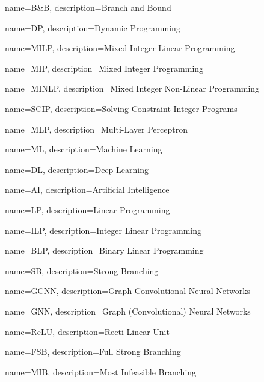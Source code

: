 

\makeglossaries %


{
        name=B\&B,
        description={Branch and Bound}
}

{
        name=DP,
        description={Dynamic Programming}
}

{
        name=MILP,
        description={Mixed Integer Linear Programming}
}

{
        name=MIP,
        description={Mixed Integer Programming}
}

{
        name=MINLP,
        description={Mixed Integer Non-Linear Programming}
}
 
{
        name=SCIP,
        description={Solving Constraint Integer Programs}
}

{
        name=MLP,
        description={Multi-Layer Perceptron}
}

{
        name=ML,
        description={Machine Learning}
}

{
        name=DL,
        description={Deep Learning}
}

{
        name=AI,
        description={Artificial Intelligence}
}

{
        name=LP,
        description={Linear Programming}
}

{
        name=ILP,
        description={Integer Linear Programming}
}

{
        name=BLP,
        description={Binary Linear Programming}
}

{
        name=SB,
        description={Strong Branching}
}

{
        name=GCNN,
        description={Graph Convolutional Neural Networks}
}

{
        name=GNN,
        description={Graph (Convolutional) Neural Networks}
}

{
        name=ReLU,
        description={Recti-Linear Unit}
}

{
        name=FSB,
        description={Full Strong Branching}
}

{
        name=MIB,
        description={Most Infeasible Branching}
}

